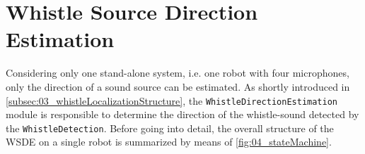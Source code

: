 \section{Whistle Source Direction Estimation} 
\label{subsec:03_directionEstimation}

Considering only one stand-alone system, i.e. one robot with four microphones,
only the direction of a sound source can be
estimated.
As shortly introduced in \cref{subsec:03_whistleLocalizationStructure},
the \lstinline!WhistleDirectionEstimation! module is responsible to
determine the direction of the whistle-sound detected by the \lstinline!WhistleDetection!.
Before going into detail, the overall structure of the \ac{WSDE} on a single robot
is summarized by means of \cref{fig:04_stateMachine}.


